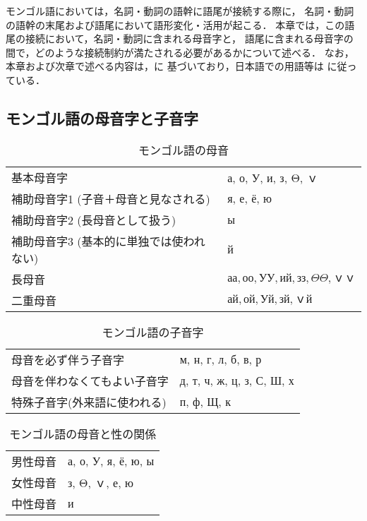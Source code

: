 モンゴル語においては，名詞・動詞の語幹に語尾が接続する際に，
名詞・動詞の語幹の末尾および語尾において語形変化・活用が起こる．
本章では，この語尾の接続において，名詞・動詞に含まれる母音字と，
語尾に含まれる母音字の間で，どのような接続制約が満たされる必要があるかについて述べる．
なお，本章および次章で述べる内容は，\cite{Mongol00aj}に
基づいており，日本語での用語等は
\cite{Kuribayashi92aj}に従っている．

\subsection{モンゴル語の母音字と子音字}

\begin{table*}
 \caption{\label{tbl:vowels}モンゴル語の母音}
 \begin{center}
  \begin{tabular}{|l|l|}
   \hline
   基本母音字 & {а, о, У, и, з, Θ, ｖ} \\
   補助母音字1 (子音＋母音と見なされる) & {я, е, ё, ю} \\
   補助母音字2 (長母音として扱う)& {ы} \\
   補助母音字3 (基本的に単独では使われない) & {й} \\
   \hline
   長母音 & ${а\!\!а, о\!\!о, У\!\!У, и\!\!й, з\!\!з, Θ\!\!Θ, ｖ\!\!ｖ}$ \\
   二重母音 & ${а\!\!й, о\!\!й, У\!\!й, з\!\!й, ｖ\!\!й}$ \\
   \hline
  \end{tabular}
 \end{center}
\end{table*}

\begin{table*}
 \caption{\label{tbl:consonents}モンゴル語の子音字}
 \begin{center}
  \begin{tabular}{|l|l|}
   \hline
   母音を必ず伴う子音字        & {м, н, г, л, б, в, р} \\
   母音を伴わなくてもよい子音字 & {д, т, ч, ж, ц, з, С, Ш, х} \\
   特殊子音字(外来語に使われる) & {п, ф, Щ, к} \\
   \hline
  \end{tabular}
 \end{center}
\end{table*}


\begin{table}
 \caption{\label{tbl:gender}モンゴル語の母音と性の関係}
 \begin{center}
  \begin{tabular}{|l|l|}
   \hline
    男性母音 & {а, о, У, я, ё, ю, ы} \\
    女性母音 & {з, Θ, ｖ, е, ю} \\
    中性母音 & {и} \\
   \hline
  \end{tabular}
 \end{center}
\end{table}

